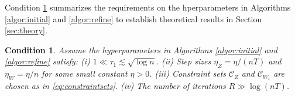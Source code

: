 \documentclass[12pt]{article}
\newtheorem{condition}{Condition}
\begin{document}
Condition \ref{cond:tuning12} summarizes the  requirements on the hperparameters  in Algorithms   \ref{algor:initial} and \ref{algor:refine}  to establish theoretical results in Section \ref{sec:theory}.  

\begin{condition}\label{cond:tuning12}
Assume the hyperparameters in Algorithms   \ref{algor:initial} and \ref{algor:refine}  satisfy:  
(i) $1 \ll \tau_1 \lesssim \sqrt{\log n}$.   (ii) Step sizes  $ \eta_Z = \eta/(nT)$ and $\eta_W = \eta/n$ for some small constant $\eta > 0$. (iii) Constraint sets $\mathcal{C}_Z$ and $\mathcal{C}_{W_t}$ are chosen as in \eqref{eq:constraintsets}. (iv) The number of iterations $R \gg \log(nT)$. 
\end{condition}


    




\end{document}
